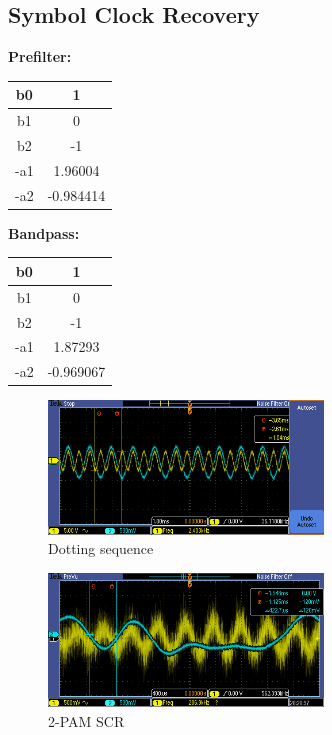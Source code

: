 \documentclass{article}
\begin{document}
\subsection{Symbol Clock Recovery}

\textbf{Prefilter:}

\begin{center}
\begin{tabular}{c|c}
b0	&	 1				\\ \hline
b1	&  0				\\ \hline
b2	& -1				\\ \hline
-a1	&	 1.96004	\\ \hline
-a2	&	-0.984414
\end{tabular}
\end{center}

\textbf{Bandpass:}

\begin{center}
\begin{tabular}{c|c}
b0	&	 1				\\ \hline
b1	&  0				\\ \hline
b2	& -1				\\ \hline
-a1	&	 1.87293\\ \hline
-a2	&	-0.969067
\end{tabular}
\end{center}

\begin{figure}[h]
  \begin{center}
    \includegraphics[width=0.65\textwidth]{img/dotting_sequence_SCR.png}
    \caption{Dotting sequence}
  \end{center}
\end{figure}

\begin{figure}[h]
  \begin{center}
    \includegraphics[width=0.65\textwidth]{img/2PAM_SCR.png}
    \caption{2-PAM SCR}
  \end{center}
\end{figure}
\end{document}
